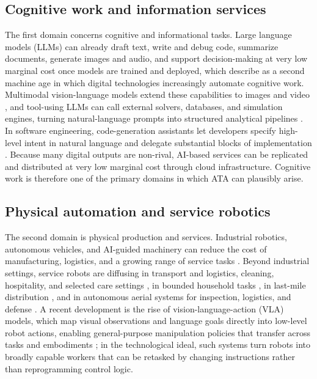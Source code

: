 \documentclass[11pt]{article}
\begin{document}
\subsection{Cognitive work and information services}

The first domain concerns cognitive and informational tasks. Large language models (LLMs) can already draft text, write and debug code, summarize documents, generate images and audio, and support decision-making at very low marginal cost once models are trained and deployed, which \citet{BrynjolfssonMcAfee2014} describe as a second machine age in which digital technologies increasingly automate cognitive work. Multimodal vision-language models extend these capabilities to images and video \citep{Jeong2024RobotLLM}, and tool-using LLMs can call external solvers, databases, and simulation engines, turning natural-language prompts into structured analytical pipelines \citep{Schick2023Toolformer}. In software engineering, code-generation assistants let developers specify high-level intent in natural language and delegate substantial blocks of implementation \citep{Ziegler2022NeuralCodeCompletion}. Because many digital outputs are non-rival, AI-based services can be replicated and distributed at very low marginal cost through cloud infrastructure. Cognitive work is therefore one of the primary domains in which ATA can plausibly arise.

\subsection{Physical automation and service robotics}

The second domain is physical production and services. Industrial robotics, autonomous vehicles, and AI-guided machinery can reduce the cost of manufacturing, logistics, and a growing range of service tasks \citep{Ford2015, AcemogluRestrepo2018}. Beyond industrial settings, service robots are diffusing in transport and logistics, cleaning, hospitality, and selected care settings \citep{IFR2025ServiceRobotsBoom, Adeyemo2025UmbrellaRobotsNursing}, in bounded household tasks \citep{SahinGuvenc2007HouseholdRobotics}, in last-mile distribution \citep{DeMaioGhianiLaganaManni2024LastMile}, and in autonomous aerial systems for inspection, logistics, and defense \citep{Clapp2025MilitaryDronesEPRS}. A recent development is the rise of vision-language-action (VLA) models, which map visual observations and language goals directly into low-level robot actions, enabling general-purpose manipulation policies that transfer across tasks and embodiments \citep{Brohan2023RT2, Kawaharazuka2025VLA}; in the technological ideal, such systems turn robots into broadly capable workers that can be retasked by changing instructions rather than reprogramming control logic.
\end{document}
